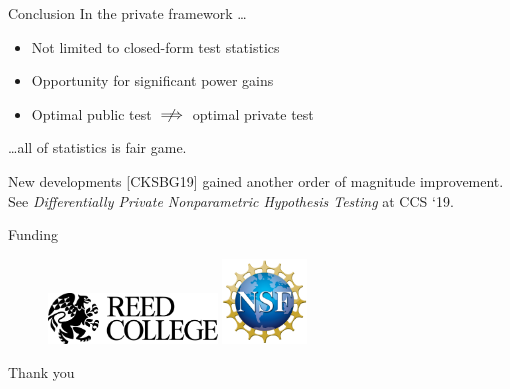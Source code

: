 \documentclass{beamer}
\begin{document}
\begin{frame}{Conclusion}
\large In the private framework \ldots \par \pause
 \normalsize
\begin{itemize}
	\item Not limited to closed-form test statistics \pause
	\item Opportunity for significant power gains \pause
	\item Optimal public test $\centernot \implies$ optimal private test \pause
\end{itemize}

\large \ldots all of statistics is fair game. \pause
 \normalsize
 
 \begin{block}{New developments}
[CKSBG19] gained another order of magnitude improvement. See \textit{Differentially Private Nonparametric Hypothesis Testing} at CCS `19.
 \end{block} \pause
Funding
\begin{figure}
\includegraphics[width=0.4\textwidth]{images/reed-logo}%
\includegraphics[width=0.2\textwidth]{images/NSF-logo}
\end{figure}

\end{frame}



\begin{frame}{}
    \begin{center}
        \Huge Thank you
    \end{center}    
\end{frame}
\end{document}
